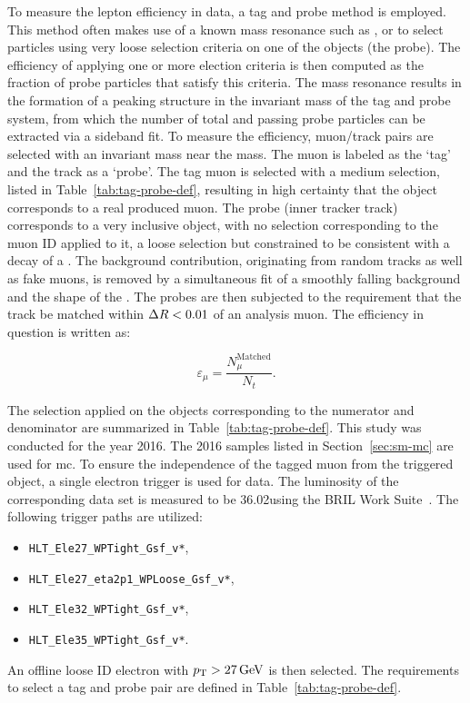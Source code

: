 To measure the lepton efficiency in data, a tag and probe method is employed. This method often makes use of a known mass resonance such as \PZ, \JPsi or \PGU to select particles using very loose selection criteria on one of the objects (the probe). The efficiency of applying one or more election criteria is then computed as the fraction of probe particles that satisfy this criteria. The mass resonance results in the formation of a peaking structure in the invariant mass of the tag and probe system, from which the number of total and passing probe particles can be extracted via a sideband fit. To measure the efficiency, muon/track pairs are selected with an invariant mass near the \JPsi mass. The muon is labeled as the `tag' and the track as a `probe'. The tag muon is selected with a medium selection, listed in Table~\ref{tab:tag-probe-def}, resulting in high certainty that the object corresponds to a real produced muon. The probe (inner tracker track) corresponds to a very inclusive object, with no selection corresponding to the muon ID applied to it, a loose selection but constrained to be consistent with a decay of a \JPsi. The background contribution, originating from random tracks as well as fake muons, is removed by a simultaneous fit of a smoothly falling background and the shape of the \JPsi. The probes are then subjected to the requirement that the track be matched within $\Delta R<0.01$ of an analysis muon. The efficiency in question is written as:

\begin{equation}
\varepsilon_{\mu} = \frac{N_{\mu}^\text{Matched}}{N_{t}}.
\end{equation}

The selection applied on the objects corresponding to the numerator and denominator are summarized in Table~\ref{tab:tag-probe-def}. This study was conducted for the year 2016. The 2016 samples listed in Section~\ref{sec:sm-mc} are used for \gls{mc}. To ensure the independence of the tagged muon from the triggered object, a single electron trigger is used for data. The luminosity of the corresponding data set is measured to be 36.02\fbinv using the BRIL Work Suite~\cite{bril}. The following trigger paths are utilized:
\begin{itemize}
\item \texttt{HLT\_Ele27\_WPTight\_Gsf\_v*},
\item \texttt{HLT\_Ele27\_eta2p1\_WPLoose\_Gsf\_v*},
\item \texttt{HLT\_Ele32\_WPTight\_Gsf\_v*},
\item \texttt{HLT\_Ele35\_WPTight\_Gsf\_v*}.
\end{itemize}
An offline loose ID electron with $p_{\mathrm{T}}>27\,\text{Ge\hspace{-.08em}V}$ is then selected. The requirements to select a tag and probe pair are defined in Table~\ref{tab:tag-probe-def}.


